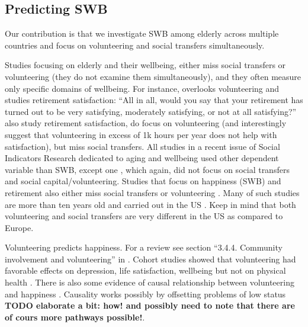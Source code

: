 \documentclass[10pt, letterpaper]{article}
\begin{document}
\begin{spacing}{1.4}
\section{Predicting SWB}

Our contribution is that we  investigate SWB among elderly
across multiple countries and focus on volunteering and social transfers simultaneously.  


Studies focusing on elderly and their wellbeing, either miss social
transfers or volunteering (they do not examine them simultaneously), and they
often measure only specific domains of wellbeing. For instance,
\citet{bender12} overlooks volunteering and studies retirement satisfaction: ``All in all,
would you say that your retirement has turned out to be very satisfying,
moderately satisfying, or not at all satisfying?''
\citet{butrica2005satisfaction} also study retirement satisfaction, do focus on
volunteering (and interestingly suggest that volunteering in excess of 1k hours
per year does not help with satisfaction), but miss social transfers. All studies in a recent issue of Social Indicators Research \citep{jurges12} dedicated to aging and
wellbeing used other dependent variable than SWB, except one
\citep{angelini2012age}, which again, did not focus on social transfers and social capital/volunteering.
Studies that focus on happiness (SWB) and retirement also either miss social
transfers or volunteering
\citep{dingemans2014involuntary,dingemans2015retirement,nikolova2014employment,angelini2012age}.
 Many of such studies are more than ten years old and carried out in the US
\citep{wheeler98,ferring10}. %
 Keep in mind that both volunteering and social transfers are very different in
 the US as compared to Europe.

%
 Volunteering predicts happiness. For a review see section 
 ``3.4.4. Community involvement and volunteering'' in \citet{dolan08al}. Cohort
 studies showed that volunteering had favorable effects on depression, life
 satisfaction, wellbeing but not on physical health \citep{jenkinson2013volunteering}.
 There is also some evidence of causal relationship between volunteering and
 happiness \citep{meier2008volunteering}.
Causality works possibly by offsetting problems
of low status \citep{borgonovi2008doing} \textbf{TODO elaborate a bit: how! and possibly
need to note that there are of cours more pathways possible!}.


\end{spacing}
\end{document}
